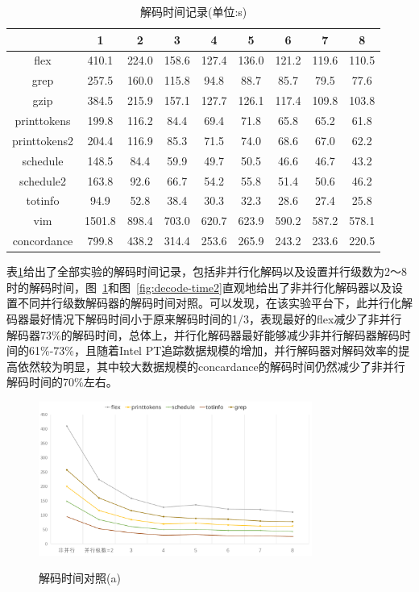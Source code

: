 \begin{table}[ht]
  \centering
  \caption{解码时间记录(单位:s)}
  \label{tab:12}
  \begin{tabular}{c|c|c|c|c|c|c|c|c}
    \hline
     & 1& 2& 3& 4& 5& 6& 7& 8\\ \hline  
    flex& 410.1& 224.0& 158.6& 127.4& 136.0& 121.2& 119.6& 110.5\\ \hline
    grep& 257.5& 160.0& 115.8& 94.8& 88.7& 85.7& 79.5& 77.6\\ \hline
    gzip& 384.5& 215.9& 157.1& 127.7& 126.1& 117.4& 109.8& 103.8\\ \hline
    printtokens& 199.8& 116.2& 84.4& 69.4& 71.8& 65.8& 65.2& 61.8\\ \hline
    printtokens2& 204.4& 116.9& 85.3& 71.5& 74.0& 68.6& 67.0& 62.2\\ \hline
    schedule& 148.5& 84.4& 59.9& 49.7& 50.5& 46.6& 46.7& 43.2\\ \hline
    schedule2& 163.8& 92.6& 66.7& 54.2& 55.8& 51.4& 50.6& 46.2\\ \hline
    totinfo& 94.9& 52.8& 38.4& 30.3& 32.3& 28.6& 27.4& 25.8\\ \hline
    vim& 1501.8& 898.4& 703.0& 620.7& 623.9& 590.2& 587.2& 578.1\\ \hline
    concordance& 799.8& 438.2& 314.4& 253.6& 265.9& 243.2& 233.6& 220.5\\ 
    \hline
  \end{tabular}
\end{table}

表\ref{tab:12}给出了全部实验的解码时间记录，包括非并行化解码以及设置并行级数为2～8时的解码时间，图~\ref{fig:decode-time1}和图~\ref{fig:decode-time2}直观地给出了非并行化解码器以及设置不同并行级数解码器的解码时间对照。可以发现，在该实验平台下，此并行化解码器最好情况下解码时间小于原来解码时间的1/3，表现最好的flex减少了非并行解码器73\%的解码时间，总体上，并行化解码器最好能够减少非并行解码器解码时间的61\%-73\%，且随着Intel PT追踪数据规模的增加，并行解码器对解码效率的提高依然较为明显，其中较大数据规模的concardance的解码时间仍然减少了非并行解码时间的70\%左右。



\begin{figure}[!htb]
  \centering
  \includegraphics[width=0.8\textwidth]
  {figures/decode-time1.pdf}\\
  \caption{解码时间对照(a)}
  \label{fig:decode-time1}
\end{figure}

